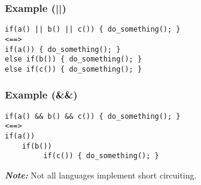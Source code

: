 \documentclass{article}
\begin{document}
\subsubsection*{Example (||)}
\begin{verbatim}
if(a() || b() || c()) { do_something(); }
<==>
if(a()) { do_something(); }
else if(b()) { do_something(); }
else if(c()) { do_something(); }
\end{verbatim}

\subsubsection*{Example (\&\&)}
\begin{verbatim}
if(a() && b() && c()) { do_something(); }
<==>
if(a()) 
    if(b()) 
         if(c()) { do_something(); }
\end{verbatim}
\textit{\textbf{Note:}} Not all languages implement short circuiting.
\end{document}
